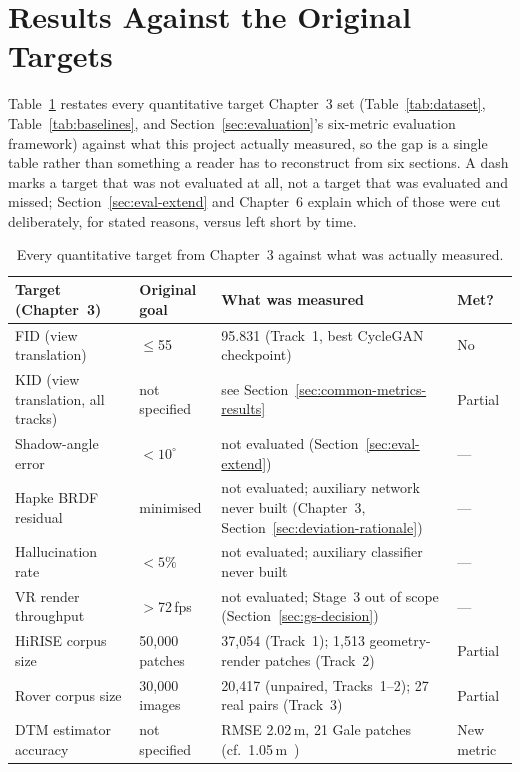 \section{Results Against the Original Targets}
\label{sec:results-vs-targets}

Table~\ref{tab:results-vs-targets} restates every quantitative target Chapter~3 set (Table~\ref{tab:dataset}, Table~\ref{tab:baselines}, and Section~\ref{sec:evaluation}'s six-metric evaluation framework) against what this project actually measured, so the gap is a single table rather than something a reader has to reconstruct from six sections. A dash marks a target that was not evaluated at all, not a target that was evaluated and missed; Section~\ref{sec:eval-extend} and Chapter~6 explain which of those were cut deliberately, for stated reasons, versus left short by time.

\begin{table}[H]
  \caption{Every quantitative target from Chapter~3 against what was actually measured.}
  \label{tab:results-vs-targets}
  \centering
  \small
  \begin{tabular}{p{3.8cm}p{2.6cm}p{5cm}p{2cm}}
    \toprule
    Target (Chapter~3) & Original goal & What was measured & Met? \\
    \midrule
    FID (view translation) & $\leq$55 & 95.831 (Track~1, best CycleGAN checkpoint) & No \\
    KID (view translation, all tracks) & not specified & see Section~\ref{sec:common-metrics-results} & Partial \\
    Shadow-angle error & $<10^{\circ}$ & not evaluated (Section~\ref{sec:eval-extend}) & --- \\
    Hapke BRDF residual & minimised & not evaluated; auxiliary network never built (Chapter~3, Section~\ref{sec:deviation-rationale}) & --- \\
    Hallucination rate & $<5\%$ & not evaluated; auxiliary classifier never built & --- \\
    VR render throughput & $>$72\,fps & not evaluated; Stage~3 out of scope (Section~\ref{sec:gs-decision}) & --- \\
    HiRISE corpus size & 50{,}000 patches & 37{,}054 (Track~1); 1{,}513 geometry-render patches (Track~2) & Partial \\
    Rover corpus size & 30{,}000 images & 20{,}417 (unpaired, Tracks~1--2); 27 real pairs (Track~3) & Partial \\
    DTM estimator accuracy & not specified & RMSE 2.02\,m, 21 Gale patches (cf.\ 1.05\,m~\cite{tao2021madnet}) & New metric \\
    \bottomrule
  \end{tabular}
\end{table}

